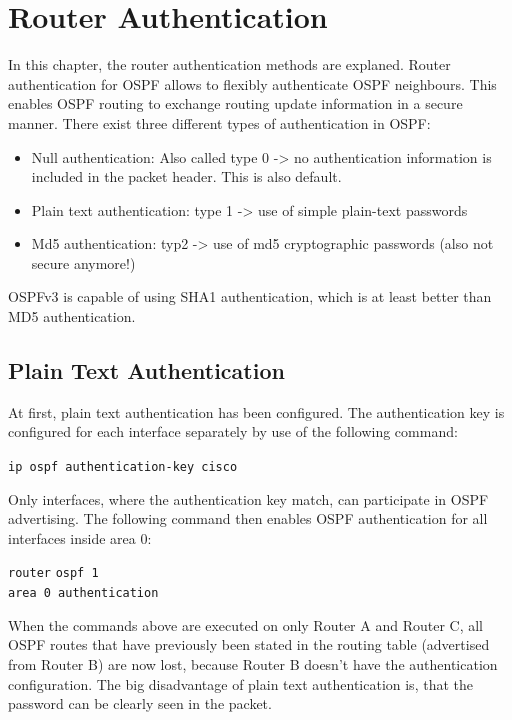 \chapter{Router Authentication}

In this chapter, the router authentication methods are explaned. Router authentication for \ac{OSPF} allows to flexibly authenticate \ac{OSPF} neighbours. This enables \ac{OSPF} routing to exchange routing update information in a secure manner.
There exist three different types of authentication in OSPF:
\begin{itemize}
\item Null authentication: Also called type 0 -> no authentication information is included in the packet header. This is also default.
\item Plain text authentication: type 1 -> use of simple plain-text passwords
\item Md5 authentication: typ2 -> use of md5 cryptographic passwords (also not secure anymore!)
\end{itemize}

OSPFv3 is capable of using SHA1 authentication, which is at least better than MD5 authentication.

\section{Plain Text Authentication}

At first, plain text authentication has been configured.
The authentication key is configured for each interface separately by use of the following command:

\texttt{ip ospf authentication-key cisco}

Only interfaces, where the authentication key match, can participate in OSPF advertising.
The following command then enables OSPF authentication for all interfaces inside area 0:

\begin{tabbing}
\texttt{router} \= \texttt{ospf 1} \\
\> \texttt{area 0 authentication}
\end{tabbing}

When the commands above are executed on only Router A and Router C, all OSPF routes that have previously been stated in the routing table (advertised from Router B) are now lost, because Router B doesn’t have the authentication configuration.
The big disadvantage of plain text authentication is, that the password can be clearly seen in the packet.

